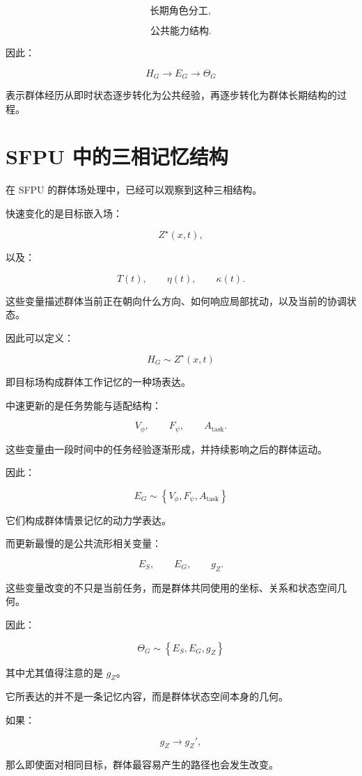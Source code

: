 \[
\text{长期角色分工},
\]

\[
\text{公共能力结构}.
\]

因此：

\[
\boxed{
H_G
\rightarrow
E_G
\rightarrow
\Theta_G
}
\]

表示群体经历从即时状态逐步转化为公共经验，再逐步转化为群体长期结构的过程。


\section{SFPU 中的三相记忆结构}

在 SFPU 的群体场处理中，已经可以观察到这种三相结构。

快速变化的是目标嵌入场：

\[
Z^\star(x,t),
\]

以及：

\[
T(t),
\qquad
\eta(t),
\qquad
\kappa(t).
\]

这些变量描述群体当前正在朝向什么方向、如何响应局部扰动，以及当前的协调状态。

因此可以定义：

\[
\boxed{
H_G
\sim
Z^\star(x,t)
}
\]

即目标场构成群体工作记忆的一种场表达。

中速更新的是任务势能与适配结构：

\[
V_\phi,
\qquad
F_\psi,
\qquad
A_{\mathrm{task}}.
\]

这些变量由一段时间中的任务经验逐渐形成，并持续影响之后的群体运动。

因此：

\[
\boxed{
E_G
\sim
\left\{
V_\phi,
F_\psi,
A_{\mathrm{task}}
\right\}
}
\]

它们构成群体情景记忆的动力学表达。

而更新最慢的是公共流形相关变量：

\[
E_S,
\qquad
E_G,
\qquad
g_Z.
\]

这些变量改变的不只是当前任务，而是群体共同使用的坐标、关系和状态空间几何。

因此：

\[
\boxed{
\Theta_G
\sim
\left\{
E_S,
E_G,
g_Z
\right\}
}
\]

其中尤其值得注意的是 $g_Z$。

它所表达的并不是一条记忆内容，而是群体状态空间本身的几何。

如果：

\[
g_Z
\rightarrow
g_Z',
\]

那么即使面对相同目标，群体最容易产生的路径也会发生改变。

